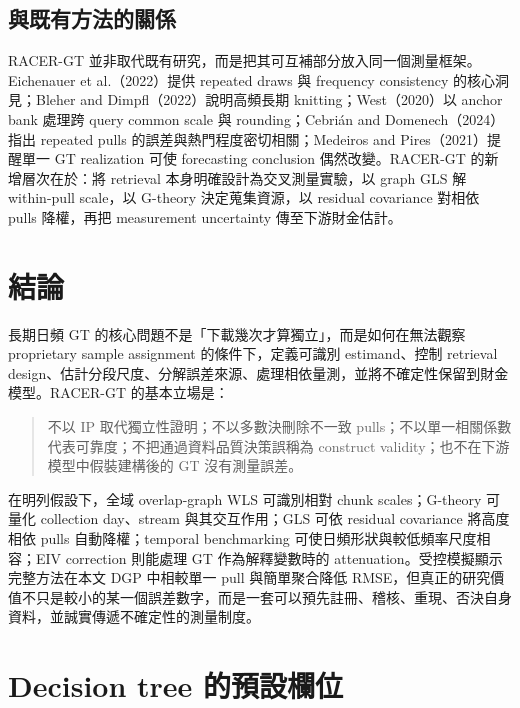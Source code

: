 \documentclass[12pt,a4paper,oneside]{article}
\begin{document}
\subsection{與既有方法的關係}

RACER-GT 並非取代既有研究，而是把其可互補部分放入同一個測量框架。Eichenauer et al.（2022）提供 repeated draws 與 frequency consistency 的核心洞見；Bleher and Dimpfl（2022）說明高頻長期 knitting；West（2020）以 anchor bank 處理跨 query common scale 與 rounding；Cebrián and Domenech（2024）指出 repeated pulls 的誤差與熱門程度密切相關；Medeiros and Pires（2021）提醒單一 GT realization 可使 forecasting conclusion 偶然改變。RACER-GT 的新增層次在於：將 retrieval 本身明確設計為交叉測量實驗，以 graph GLS 解 within-pull scale，以 G-theory 決定蒐集資源，以 residual covariance 對相依 pulls 降權，再把 measurement uncertainty 傳至下游財金估計。

\section{結論}

長期日頻 GT 的核心問題不是「下載幾次才算獨立」，而是如何在無法觀察 proprietary sample assignment 的條件下，定義可識別 estimand、控制 retrieval design、估計分段尺度、分解誤差來源、處理相依量測，並將不確定性保留到財金模型。RACER-GT 的基本立場是：

\begin{quote}
不以 IP 取代獨立性證明；不以多數決刪除不一致 pulls；不以單一相關係數代表可靠度；不把通過資料品質決策誤稱為 construct validity；也不在下游模型中假裝建構後的 GT 沒有測量誤差。
\end{quote}

在明列假設下，全域 overlap-graph WLS 可識別相對 chunk scales；G-theory 可量化 collection day、stream 與其交互作用；GLS 可依 residual covariance 將高度相依 pulls 自動降權；temporal benchmarking 可使日頻形狀與較低頻率尺度相容；EIV correction 則能處理 GT 作為解釋變數時的 attenuation。受控模擬顯示完整方法在本文 DGP 中相較單一 pull 與簡單聚合降低 RMSE，但真正的研究價值不只是較小的某一個誤差數字，而是一套可以預先註冊、稽核、重現、否決自身資料，並誠實傳遞不確定性的測量制度。

\appendix

\section{Decision tree 的預設欄位}
\end{document}
